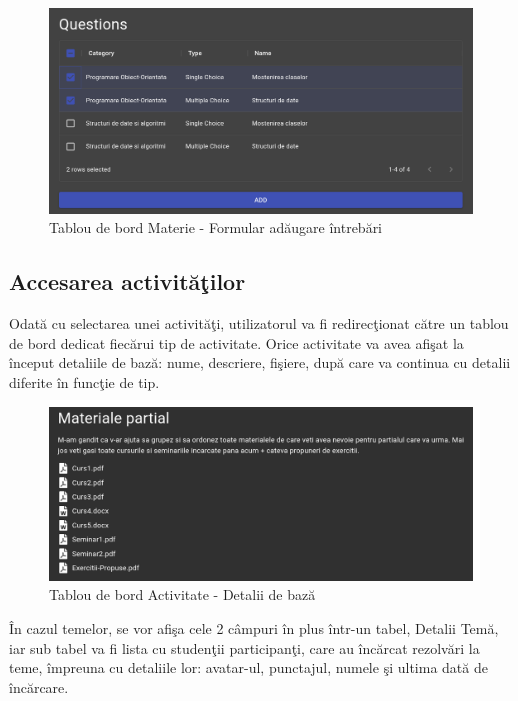 \documentclass[12pt, a4paper, oneside, romanian]{teza-upb}
\begin{document}
\begin{figure}[H]
\centering
\includegraphics*[width=\columnwidth]{tablou-de-bord-materie-formular-adaugare-intrebari}
\caption{Tablou de bord Materie - Formular adăugare întrebări}
\label{tablou-de-bord-materie-formular-adaugare-intrebari}
\end{figure}

\subsection{Accesarea activităţilor}

Odată cu selectarea unei activităţi, utilizatorul va fi redirecţionat către un tablou de bord dedicat fiecărui tip de activitate. Orice activitate va avea afişat la început detaliile de bază: nume, descriere, fişiere, după care va continua cu detalii diferite în funcţie de tip.

\begin{figure}[H]
\centering
\includegraphics*[width=\columnwidth]{tablou-de-bord-activitate-detalii-de-baza}
\caption{Tablou de bord Activitate - Detalii de bază}
\label{tablou-de-bord-activitate-detalii-de-baza}
\end{figure}

În cazul temelor, se vor afişa cele 2 câmpuri în plus într-un tabel, Detalii Temă, iar sub tabel va fi lista cu studenţii participanţi, care au încărcat rezolvări la teme, împreuna cu detaliile lor: avatar-ul, punctajul, numele şi ultima dată de încărcare.
\end{document}
